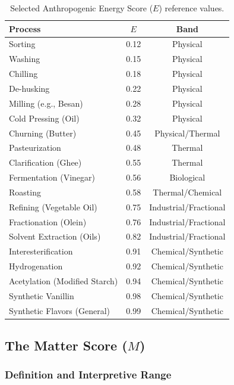 \documentclass[12pt,a3paper]{article}
\begin{document}
\begin{table}[htbp]
\centering
\caption{Selected Anthropogenic Energy Score ($E$) reference values.}
\label{tab:escores}
\renewcommand{\arraystretch}{1.2}
\begin{tabular}{lcc}
\toprule
\textbf{Process} & \textbf{$E$} & \textbf{Band} \\
\midrule
Sorting & 0.12 & Physical \\
Washing & 0.15 & Physical \\
Chilling & 0.18 & Physical \\
De-husking & 0.22 & Physical \\
Milling (e.g., Besan) & 0.28 & Physical \\
Cold Pressing (Oil) & 0.32 & Physical \\
Churning (Butter) & 0.45 & Physical/Thermal \\
Pasteurization & 0.48 & Thermal \\
Clarification (Ghee) & 0.55 & Thermal \\
Fermentation (Vinegar) & 0.56 & Biological \\
Roasting & 0.58 & Thermal/Chemical \\
Refining (Vegetable Oil) & 0.75 & Industrial/Fractional \\
Fractionation (Olein) & 0.76 & Industrial/Fractional \\
Solvent Extraction (Oils) & 0.82 & Industrial/Fractional \\
Interesterification & 0.91 & Chemical/Synthetic \\
Hydrogenation & 0.92 & Chemical/Synthetic \\
Acetylation (Modified Starch) & 0.94 & Chemical/Synthetic \\
Synthetic Vanillin & 0.98 & Chemical/Synthetic \\
Synthetic Flavors (General) & 0.99 & Chemical/Synthetic \\
\bottomrule
\end{tabular}
\end{table}

\subsection{The Matter Score ($M$)}

\subsubsection{Definition and Interpretive Range}
\end{document}
